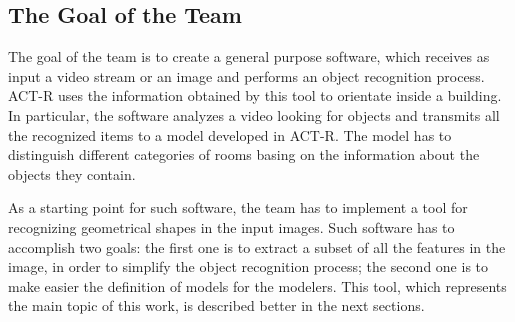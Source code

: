 		\subsection{The Goal of the Team}\label{goalTeam}
		The goal of the team is to create a general purpose software, which receives as input a video stream or an image and performs an object recognition process.
		\mbox{ACT-R} uses the information obtained by this tool to orientate inside a building.
		In particular, the software analyzes a video looking for objects and transmits all the recognized items to a model developed in \mbox{ACT-R}. The model has to distinguish different categories of rooms basing on the information about the objects they contain.

		As a starting point for such software, the team has to implement a tool for recognizing geometrical shapes in the input images. Such software has to accomplish two goals: the first one is to extract a subset of all the features in the image, in order to simplify the object recognition process; the second one is to make easier the definition of models for the modelers. This tool, which represents the main topic of this work, is described better in the next sections. 
		

